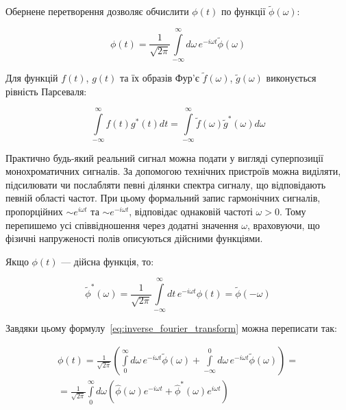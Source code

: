 Обернене перетворення дозволяє обчислити $\phi(t)$ по функції $\tilde{\phi}(\omega)$:

\begin{equation}
	\phi(t) = \frac{1}{\sqrt{2\pi}} \int\limits_{-\infty}^{\infty} d\omega \, e^{-i\omega t} \tilde{\phi}(\omega)
	\label{eq:inverse_fourier_transform}
\end{equation}

Для функцій $f(t)$, $g(t)$ та їх образів Фур'є $\tilde{f}(\omega)$, $\tilde{g}(\omega)$ виконується рівність Парсеваля:

\begin{equation}\label{eq:Parseval}
	\int\limits_{-\infty}^{\infty} f(t)g^{*}(t)dt = \int\limits_{-\infty}^{\infty} \tilde{f}(\omega)\tilde{g}^{*}(\omega)d\omega
\end{equation}

Практично будь-який реальний сигнал можна подати у вигляді суперпозиції монохроматичних сигналів. За допомогою технічних
пристроїв можна виділяти, підсилювати чи послабляти певні ділянки спектра сигналу, що відповідають певній області
частот. При цьому формальний запис гармонічних сигналів, пропорційних $\sim e^{i\omega t}$ та $\sim e^{-i\omega t}$,
відповідає однаковій частоті $\omega > 0$. Тому перепишемо усі співвідношення через додатні значення $\omega$,
враховуючи, що фізичні напруженості полів описуються дійсними функціями.

Якщо $\phi(t)$ --- дійсна функція, то:

\begin{equation}\label{eq:conjugate_frequency}
	\tilde{\phi}^{*}(\omega) = \frac{1}{\sqrt{2\pi}} \int\limits_{-\infty}^{\infty} dt \, e^{-i\omega t} \phi(t) = \tilde{\phi}(-\omega)
\end{equation}

Завдяки цьому формулу~\eqref{eq:inverse_fourier_transform} можна переписати так:

\begin{multline*}
	\phi(t) = \frac{1}{\sqrt{2\pi}} \left( \int\limits_{0}^{\infty} d\omega \, e^{-i\omega t} \tilde{\phi}(\omega) + \int\limits_{-\infty}^{0} d\omega \,
	e^{-i\omega t}
	\tilde{\phi}(\omega) \right) = \\
	= \frac{1}{\sqrt{2\pi}} \int\limits_{0}^{\infty} d\omega \left( \hat{\phi}(\omega) e^{-i\omega t} + \hat{\phi}^{*}(\omega) e^{i\omega t} \right)
\end{multline*}

